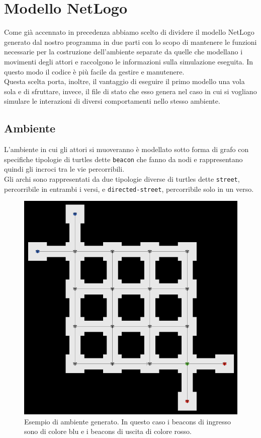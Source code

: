 \section{Modello NetLogo}
Come già accennato in precedenza abbiamo scelto di dividere il modello NetLogo generato dal nostro programma in due parti con lo scopo di mantenere le funzioni necessarie per la costruzione dell'ambiente separate da quelle che modellano i movimenti degli attori e raccolgono le informazioni sulla simulazione eseguita. In questo modo il codice è più facile da gestire e manutenere.\\
Questa scelta porta, inoltre, il vantaggio di eseguire il primo modello una vola sola e di sfruttare, invece, il file di stato che esso genera nel caso in cui si vogliano simulare le interazioni di diversi comportamenti nello stesso ambiente.
\subsection{Ambiente}
L'ambiente in cui gli attori si muoveranno è modellato sotto forma di grafo con specifiche tipologie di turtles dette \texttt{beacon} che fanno da nodi e rappresentano quindi gli incroci tra le vie percorribili.\\
Gli archi sono rappresentati da due tipologie diverse di turtles dette \texttt{street}, percorribile in entrambi i versi, e \texttt{directed-street}, percorribile solo in un verso.\\
\begin{figure}[htbp]
\centering
\includegraphics[width=\textwidth,height=\textheight,keepaspectratio]{images/ambiente-screen.png}
\caption{Esempio di ambiente generato. In questo caso i beacons di ingresso sono di colore blu e i beacons di uscita di colore rosso.}
\label{fig:ambiente-screen}
\end{figure}
